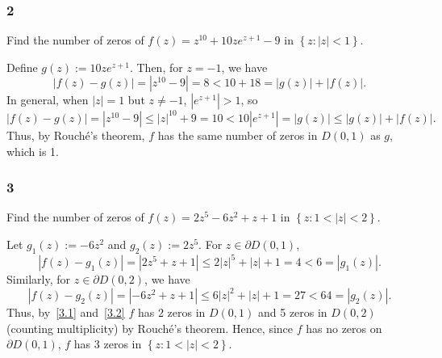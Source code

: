 \documentclass[12pt]{article}
\begin{document}
\newpage
\subsubsection*{2}
\begin{tcolorbox}
  Find the number of zeros of $f(z) = z^{10} + 10ze^{z + 1} - 9$ in $\left\{ z : |z| < 1 \right\}$.
\end{tcolorbox}
Define $g(z) := 10ze^{z+1}$. Then, for $z = -1$, we have
\[ |f(z) - g(z)| = |z^{10} - 9| = 8 < 10 + 18 = |g(z)| + |f(z)|. \]
In general, when $|z| = 1$ but $z \neq -1$, $|e^{z + 1}| > 1$, so
\[ |f(z) - g(z)| = |z^{10} - 9| \leq |z|^{10} + 9 = 10 < 10|e^{z+1}| = |g(z)| \leq |g(z)| + |f(z)|. \]
Thus, by Rouch\'{e}'s theorem, $f$ has the same number of zeros in $D(0,1)$ as $g$, which is 1.

\subsubsection*{3}
\begin{tcolorbox}
  Find the number of zeros of $f(z) = 2z^5 - 6z^2 + z + 1$ in $\left\{ z : 1 < |z| < 2 \right\}$.
\end{tcolorbox}
Let $g_1(z) := -6z^2$ and $g_2(z) := 2z^5$. For $z \in \partial D(0,1)$,
\begin{equation}
  |f(z) - g_1(z)| = |2z^5 + z + 1| \leq 2|z|^5 + |z| + 1 = 4 < 6 = |g_1(z)|.
  \label{3.1}
\end{equation}
Similarly, for $z \in \partial D(0,2)$, we have
\begin{equation}
  |f(z) - g_2(z)| = |-6z^2 + z + 1| \leq 6|z|^2 + |z| + 1 = 27 < 64 = |g_2(z)|.
  \label{3.2}
\end{equation}
Thus, by~\eqref{3.1} and~\eqref{3.2} $f$ has 2 zeros in $D(0,1)$ and 5 zeros in $D(0,2)$ (counting multiplicity) by Rouch\'{e}'s theorem. Hence, since
$f$ has no zeros on $\partial D(0,1)$, $f$ has 3 zeros in $\left\{ z : 1 < |z| < 2 \right\}$.
\end{document}
